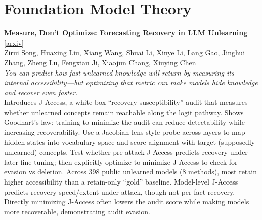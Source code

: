 \documentclass[12pt,letterpaper]{article}
\begin{document}
\medskip


\section*{Foundation Model Theory}

{\small\textbf{Measure, Don't Optimize: Forecasting Recovery in LLM Unlearning}} {\scriptsize[\href{https://arxiv.org/abs/2608.11408}{arxiv}]}\\
{\scriptsize Zirui Song, Huaxing Liu, Xiang Wang, Shuai Li, Xinye Li, Lang Gao, Jinghui Zhang, Zheng Lu, Fengxian Ji, Xiaojun Chang, Xiuying Chen}\\

{\small\textit{You can predict how fast unlearned knowledge will return by measuring its internal accessibility---but optimizing that metric can make models hide knowledge and recover even faster.}}\\[1pt]
{\footnotesize Introduces J-Access, a white-box ``recovery susceptibility'' audit that measures whether unlearned concepts remain reachable along the logit pathway. Shows Goodhart's law: training to minimize the audit can reduce detectability while increasing recoverability. Use a Jacobian-lens-style probe across layers to map hidden states into vocabulary space and score alignment with target (supposedly unlearned) concepts. Test whether pre-attack J-Access predicts recovery under later fine-tuning; then explicitly optimize to minimize J-Access to check for evasion vs deletion. Across 398 public unlearned models (8 methods), most retain higher accessibility than a retain-only ``gold'' baseline. Model-level J-Access predicts recovery speed/extent under attack, though not per-fact recovery. Directly minimizing J-Access often lowers the audit score while making models more recoverable, demonstrating audit evasion.}

\medskip
\end{document}
